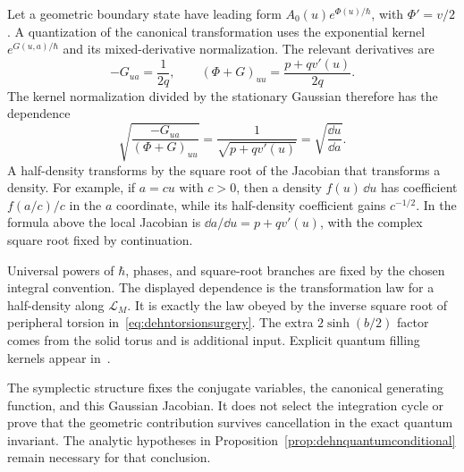 Let a geometric boundary state have leading form
$A_0(u)e^{\Phi(u)/\hbar}$, with $\Phi'=v/2$.
A quantization of the canonical transformation uses the exponential
kernel $e^{G(u,a)/\hbar}$ and its mixed-derivative normalization.
The relevant derivatives are
\[
 -G_{ua}=\frac1{2q},\qquad
 (\Phi+G)_{uu}=\frac{p+qv'(u)}{2q}.
\]
The kernel normalization divided by the stationary Gaussian therefore
has the dependence
\begin{equation}
 \boxed{\sqrt{\frac{-G_{ua}}{(\Phi+G)_{uu}}}
    =\frac1{\sqrt{p+qv'(u)}}
    =\sqrt{\frac{\dd u}{\dd a}}.}
 \label{eq:NZhalfdensity}
\end{equation}
A half-density transforms by the square root of the Jacobian
that transforms a density. For example, if $a=cu$ with $c>0$,
then a density $f(u)\,\dd u$ has coefficient $f(a/c)/c$
in the $a$ coordinate, while its half-density coefficient gains
$c^{-1/2}$. In the formula above the local Jacobian is
$\dd a/\dd u=p+qv'(u)$, with the complex square root fixed by
continuation.

Universal powers of $\hbar$, phases, and square-root branches are
fixed by the chosen integral convention. The displayed dependence is
the transformation law for a half-density along $\mathcal L_M$.
It is exactly the law obeyed by the inverse square root of peripheral
torsion in~\eqref{eq:dehntorsionsurgery}. The extra
$2\sinh(b/2)$ factor comes from the solid torus and is additional
input. Explicit quantum filling kernels appear
in~\cite[equations (12)--(14)]{GangRomoYamazaki}.

The symplectic structure fixes the conjugate variables, the canonical
generating function, and this Gaussian Jacobian. It does not select
the integration cycle or prove that the geometric contribution
survives cancellation in the exact quantum invariant. The analytic
hypotheses in Proposition~\ref{prop:dehnquantumconditional} remain
necessary for that conclusion.


